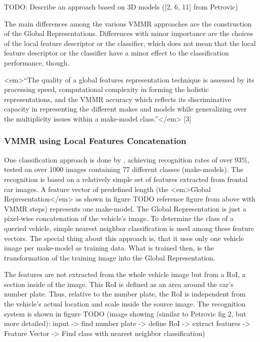 TODO: Describe an approach based on 3D models ([2, 6, 11] from Petrovic)

The main differences among the various VMMR approaches are the construction of the Global Representations. Differences with minor importance are the choices of the local feature descriptor or the classifier, which does not mean that the local feature descriptor or the classifier have a minor effect to the classification performance, though.

<em>“The quality of a global features representation technique is assessed by its processing speed, computational complexity in forming the holistic representations, and the VMMR accuracy which reflects its discriminative capacity in representing the different makes and models while generalizing over the multiplicity issues within a make-model class.”</em> [3]

\subsubsection{VMMR using Local Features Concatenation}
One classification approach is done by \citeauthor{petrovic2004analysis} \cite{petrovic2004analysis}, achieving recognition rates of over 93\%, tested on over 1000 images containing 77 different classes (make-models). The recognition is based on a relatively simple set of features extracted from frontal car images. A feature vector of predefined length (the <em>Global Representation</em> as shown in figure TODO reference figure from above with VMMR steps) represents one make-model. The Global Representation is just a pixel-wise concatenation of the vehicle’s image. To determine the class of a queried vehicle, simple nearest neighbor classification is used among these feature vectors. The special thing about this approach is, that it uses only one vehicle image per make-model as training data. What is trained then, is the transformation of the training image into the Global Representation.

The features are not extracted from the whole vehicle image but from a RoI, a section inside of the image. This RoI is defined as an area around the car’s number plate. Thus, relative to the number plate, the RoI is independent from the vehicle’s actual location and scale inside the source image. The recognition system is shown in figure TODO (image showing (similar to Petrovic fig 2, but more detailed): input -> find number plate -> define RoI -> extract features -> Feature Vector -> Find class with nearest neighbor classification)

